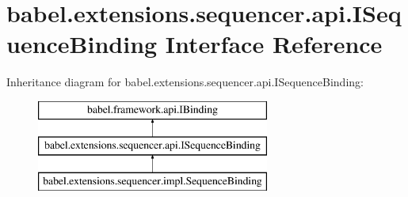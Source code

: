 \hypertarget{interfacebabel_1_1extensions_1_1sequencer_1_1api_1_1_i_sequence_binding}{\section{babel.\-extensions.\-sequencer.\-api.\-I\-Sequence\-Binding Interface Reference}
\label{interfacebabel_1_1extensions_1_1sequencer_1_1api_1_1_i_sequence_binding}
}
Inheritance diagram for babel.\-extensions.\-sequencer.\-api.\-I\-Sequence\-Binding\-:\begin{figure}[H]
\begin{center}
\leavevmode
\includegraphics[height=3.000000cm]{interfacebabel_1_1extensions_1_1sequencer_1_1api_1_1_i_sequence_binding}
\end{center}
\end{figure}
